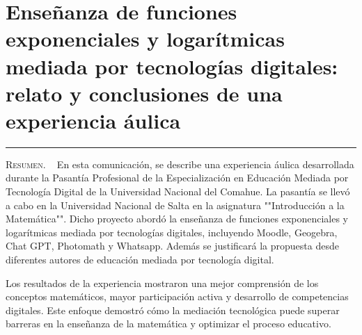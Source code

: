 \thispagestyle{portadapage}
\setcounter{subsection}{0}
\setcounter{subsubsection}{0}
\setcounter{actividad}{0}
\setcounter{actividad_previa}{0}
\setcounter{actividad_entre}{0}
\renewcommand{\articulotipo}{Comunicación breve}
\renewcommand{\articulotitulo}{Enseñanza de funciones exponenciales y logarítmicas mediada por tecnologías digitales: relato y conclusiones de una experiencia áulica}
\renewcommand{\articulotitulocorto}{Enseñanza de funciones exponenciales y logarítmicas mediada por tecnologías digitales}
\section{\articulotitulo}

\noindent\rule{\linewidth}{2pt}

\vspace{0.25cm}

\begin{flushright}
\end{flushright}

\vspace{0.5cm}

\begin{center}
	\begin{minipage}{0.75\linewidth} \small
		\textsc{Resumen}. ~
		En esta comunicación, se describe una experiencia áulica desarrollada durante la Pasantía Profesional de la Especialización en Educación Mediada por Tecnología Digital de la Universidad Nacional del Comahue. La pasantía se llevó a cabo en la Universidad Nacional de Salta en la asignatura ""Introducción a la Matemática"". Dicho proyecto abordó la enseñanza de funciones exponenciales y logarítmicas mediada por tecnologías digitales, incluyendo Moodle, Geogebra, Chat GPT, Photomath y Whatsapp. Además se justificará la propuesta desde diferentes autores de educación mediada por tecnología digital.
		
		Los resultados de la experiencia mostraron una mejor comprensión de los conceptos matemáticos, mayor participación activa y desarrollo de competencias digitales. Este enfoque demostró cómo la mediación tecnológica puede superar barreras en la enseñanza de la matemática y optimizar el proceso educativo.
	\end{minipage}
\end{center}


